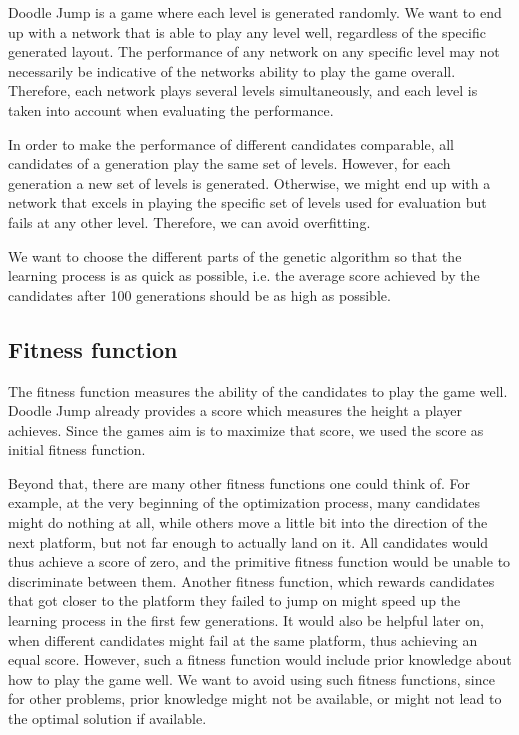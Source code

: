 \documentclass[a4paper,12pt,pagesize,headsepline,bibtotoc,titlepage,abstracton]{scrartcl}
\begin{document}
Doodle Jump is a game where each level is generated randomly. We want to end up with a network that is able to play any level well, regardless of the specific generated layout. The performance of any network on any specific level may not necessarily be indicative of the networks ability to play the game overall. Therefore, each network plays several levels simultaneously, and each level is taken into account when evaluating the performance.

In order to make the performance of different candidates comparable, all candidates of a generation play the same set of levels. However, for each generation a new set of levels is generated. Otherwise, we might end up with a network that excels in playing the specific set of levels used for evaluation but fails at any other level. Therefore, we can avoid overfitting.

We want to choose the different parts of the genetic algorithm so that the learning process is as quick as possible, i.e. the average score achieved by the candidates after 100 generations should be as high as possible.

\subsection{Fitness function}

The fitness function measures the ability of the candidates to play the game well. Doodle Jump already provides a score which measures the height a player achieves. Since the games aim is to maximize that score, we used the score as initial fitness function.

Beyond that, there are many other fitness functions one could think of. For example, at the very beginning of the optimization process, many candidates might do nothing at all, while others move a little bit into the direction of the next platform, but not far enough to actually land on it. All candidates would thus achieve a score of zero, and the primitive fitness function would be unable to discriminate between them. Another fitness function, which rewards candidates that got closer to the platform they failed to jump on might speed up the learning process in the first few generations. It would also be helpful later on, when different candidates might fail at the same platform, thus achieving an equal score. However, such a fitness function would include prior knowledge about how to play the game well. We want to avoid using such fitness functions, since for other problems, prior knowledge might not be available, or might not lead to the optimal solution if available. 
\end{document}
